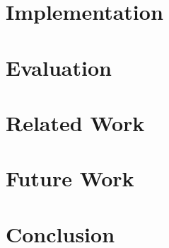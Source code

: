 \documentclass[acmlarge,review,anonymous]{acmart}\settopmatter{printfolios=true}
\begin{document}
    \section{Implementation}\label{sec:impl}
    
    
    
    \section{Evaluation}\label{sec:eval}
    
    
    \section{Related Work}\label{sec:rw}
    

    \section{Future Work}\label{sec:fw}
    
    
    \section{Conclusion}\label{sec:conc}
    
    
%

\end{document}
